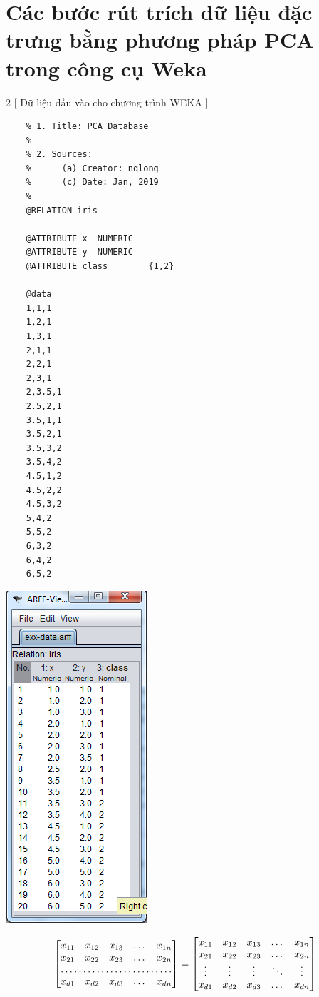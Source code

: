 \documentclass{hcmutarticle}
\begin{document}
\section{Các bước rút trích dữ liệu đặc trưng bằng phương pháp PCA trong công cụ Weka}

\begin{multicols}{2}
	[
	Dữ liệu đầu vào cho chương trình WEKA
	]
	\begin{lstlisting}
	% 1. Title: PCA Database
	% 
	% 2. Sources:
	%      (a) Creator: nqlong
	%      (c) Date: Jan, 2019
	% 
	@RELATION iris
	
	@ATTRIBUTE x  NUMERIC
	@ATTRIBUTE y  NUMERIC
	@ATTRIBUTE class        {1,2}
	
	@data
	1,1,1
	1,2,1
	1,3,1
	2,1,1
	2,2,1
	2,3,1
	2,3.5,1
	2.5,2,1
	3.5,1,1
	3.5,2,1
	3.5,3,2
	3.5,4,2
	4.5,1,2
	4.5,2,2
	4.5,3,2
	5,4,2
	5,5,2
	6,3,2
	6,4,2
	6,5,2
	\end{lstlisting}
	
	\begin{center}
		\includegraphics[scale=0.7]{image/data_weka.png}
	\end{center}
\end{multicols}

\[
\begin{bmatrix}
x_{11}       & x_{12} & x_{13} & \dots & x_{1n} \\
x_{21}       & x_{22} & x_{23} & \dots & x_{2n} \\
\hdotsfor{5} \\
x_{d1}       & x_{d2} & x_{d3} & \dots & x_{dn}
\end{bmatrix}
=
\begin{bmatrix}
x_{11} & x_{12} & x_{13} & \dots  & x_{1n} \\
x_{21} & x_{22} & x_{23} & \dots  & x_{2n} \\
\vdots & \vdots & \vdots & \ddots & \vdots \\
x_{d1} & x_{d2} & x_{d3} & \dots  & x_{dn}
\end{bmatrix}
\]
\end{document}
